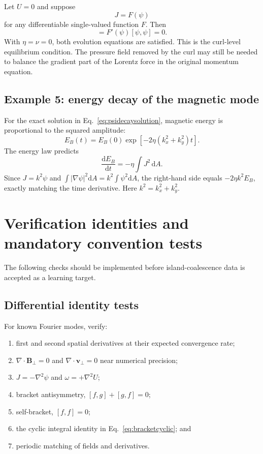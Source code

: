 \documentclass[11pt]{article}
\newcommand{\dd}{\mathrm{d}}
\newcommand{\vect}[1]{\bm{#1}}
\begin{document}
Let $U=0$ and suppose
\begin{equation}
J=F(\psi)
\end{equation}
for any differentiable single-valued function $F$. Then
\begin{equation}
[J,\psi]=F'(\psi)[\psi,\psi]=0.
\end{equation}
With $\eta=\nu=0$, both evolution equations are satisfied. This is the curl-level equilibrium condition. The pressure field removed by the curl may still be needed to balance the gradient part of the Lorentz force in the original momentum equation.

\subsection{Example 5: energy decay of the magnetic mode}

For the exact solution in Eq.~\eqref{eq:psidecaysolution}, magnetic energy is proportional to the squared amplitude:
\begin{equation}
E_B(t)=E_B(0)\exp[-2\eta(k_x^2+k_y^2)t].
\end{equation}
The energy law predicts
\begin{equation}
\frac{\dd E_B}{\dd t}=-\eta\int J^2\,\dd A.
\end{equation}
Since $J=k^2\psi$ and $\int|\nabla\psi|^2\dd A=k^2\int\psi^2\dd A$, the right-hand side equals $-2\eta k^2E_B$, exactly matching the time derivative. Here $k^2=k_x^2+k_y^2$.

\section{Verification identities and mandatory convention tests}
\label{sec:verification}

The following checks should be implemented before island-coalescence data is accepted as a learning target.

\subsection{Differential identity tests}

For known Fourier modes, verify:
\begin{enumerate}[label=\arabic*.]
  \item first and second spatial derivatives at their expected convergence rate;
  \item $\nabla\cdot\vect{B}_\perp=0$ and $\nabla\cdot\vect{v}_\perp=0$ near numerical precision;
  \item $J=-\nabla^2\psi$ and $\omega=+\nabla^2U$;
  \item bracket antisymmetry, $[f,g]+[g,f]=0$;
  \item self-bracket, $[f,f]=0$;
  \item the cyclic integral identity in Eq.~\eqref{eq:bracketcyclic}; and
  \item periodic matching of fields and derivatives.
\end{enumerate}
\end{document}

